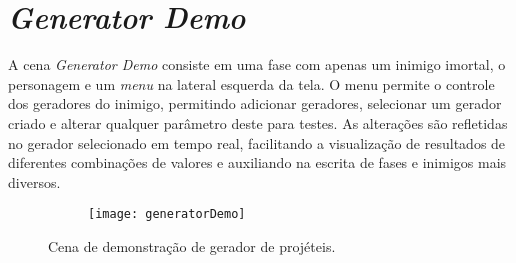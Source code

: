 
\chapter{\textit{Generator Demo}}
\label{ap:generator demo}

A cena \textit{Generator Demo} consiste em uma fase com apenas um inimigo imortal, o personagem e um \textit{menu} na lateral esquerda da tela. O menu permite o controle dos geradores do inimigo, permitindo adicionar geradores, selecionar um gerador criado e alterar qualquer parâmetro deste para testes. As alterações são refletidas no gerador selecionado em tempo real, facilitando a visualização de resultados de diferentes combinações de valores e auxiliando na escrita de fases e inimigos mais diversos.

\begin{figure}
    \centering

    \begin{subfigure}{1\textwidth}
        \centering
        \texttt{[image: generatorDemo]}
    \end{subfigure}

    \caption{Cena de demonstração de gerador de projéteis.\label{generatorDemo}}
\end{figure}
